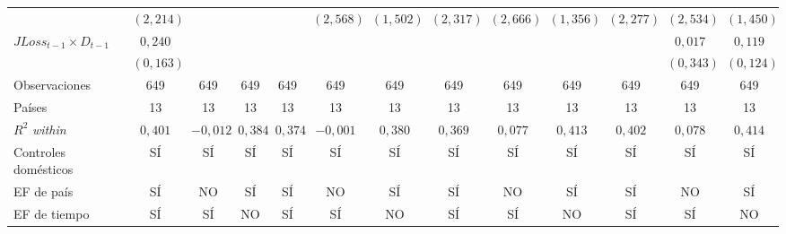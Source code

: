 \documentclass[11pt]{article}
\begin{document}
\begin{landscape}
\begin{table}
\begin{adjustbox}{max width=\linewidth, max totalheight=\tablaalto\textheight}
\begin{tabular}{l c ccc ccc ccc cc}
 & $(2{,}214)$ &  &  &  & $(2{,}568)$ & $(1{,}502)$ & $(2{,}317)$ & $(2{,}666)$ & $(1{,}356)$ & $(2{,}277)$ & $(2{,}534)$ & $(1{,}450)$ \\
$JLoss_{t-1}\times D_{t-1}$ & $0{,}240$ &  &  &  &  &  &  &  &  &  & $0{,}017$ & $0{,}119$ \\
 & $(0{,}163)$ &  &  &  &  &  &  &  &  &  & $(0{,}343)$ & $(0{,}124)$ \\
\addlinespace
Observaciones & 649 & 649 & 649 & 649 & 649 & 649 & 649 & 649 & 649 & 649 & 649 & 649 \\
Países & 13 & 13 & 13 & 13 & 13 & 13 & 13 & 13 & 13 & 13 & 13 & 13 \\
$R^2$ \textit{within} & $0{,}401$ & $-0{,}012$ & $0{,}384$ & $0{,}374$ & $-0{,}001$ & $0{,}380$ & $0{,}369$ & $0{,}077$ & $0{,}413$ & $0{,}402$ & $0{,}078$ & $0{,}414$ \\
Controles domésticos & SÍ & SÍ & SÍ & SÍ & SÍ & SÍ & SÍ & SÍ & SÍ & SÍ & SÍ & SÍ \\
\midrule
EF de país & SÍ & NO & SÍ & SÍ & NO & SÍ & SÍ & NO & SÍ & SÍ & NO & SÍ \\
EF de tiempo & SÍ & SÍ & NO & SÍ & SÍ & NO & SÍ & SÍ & NO & SÍ & SÍ & NO \\
\bottomrule
\end{tabular}
\end{adjustbox}

\end{table}
\end{landscape}
\end{document}
